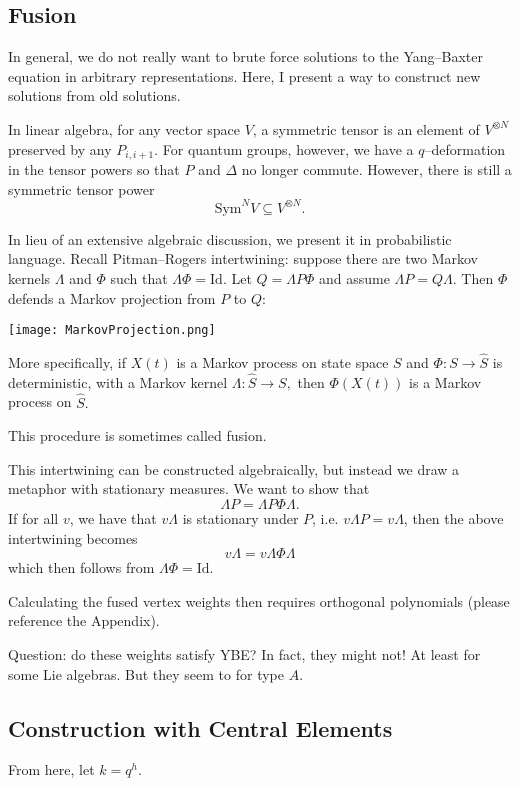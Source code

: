 \documentclass{ximera}
\begin{document}
\subsection{Fusion}
In general, we do not really want to brute force solutions to the Yang--Baxter equation in arbitrary
representations. Here, I present a way to construct new solutions from old solutions. 

In linear algebra, for any vector space $V$, a symmetric tensor is an element of $V^{\otimes N}$ 
preserved by any $P_{i,i+1}.$ For quantum groups, however, we have a $q$--deformation in the tensor powers
so that $P$ and $\Delta$ no longer commute. However, there is still a symmetric tensor power
$$
\mathrm{Sym}^N V \subseteq V^{\otimes N}.
$$

In lieu of an extensive algebraic discussion, we present it in probabilistic language. Recall
Pitman--Rogers intertwining: suppose there are 
two Markov kernels $\Lambda$ and $\Phi$ such that $\Lambda\Phi=\mathrm{Id}$. Let $Q=\Lambda P\Phi$ and 
assume $\Lambda P = Q\Lambda.$ Then $\Phi$ defends a Markov projection from $P$ to $Q$:


\texttt{[image: MarkovProjection.png]}

More specifically, if $X(t)$ is a Markov process on state space $S$ and $\Phi:S\rightarrow \hat{S}$ is deterministic, 
with a Markov kernel $\Lambda: \hat{S}\rightarrow S,$ then $\Phi(X(t))$ is a Markov process on $\hat{S}.$

This procedure is sometimes called fusion. 

This intertwining can be constructed algebraically, but instead we draw a metaphor with stationary measures.
We want to show that 
$$
\Lambda P = \Lambda P \Phi \Lambda.
$$
If for all $v$, we have that $v\Lambda$ is stationary under $P$, i.e. $v\Lambda P = v\Lambda$, then the
above intertwining becomes 
$$
v\Lambda = v\Lambda \Phi \Lambda
$$
which then follows from $\Lambda\Phi=\mathrm{Id}.$

Calculating the fused vertex weights then requires orthogonal polynomials (please reference the Appendix).

Question: do these weights satisfy YBE? In fact, they might not! At least
for some Lie algebras. But they seem to for type $A.$

\subsection{Construction with Central Elements}
From here, let $k=q^h.$
\end{document}
